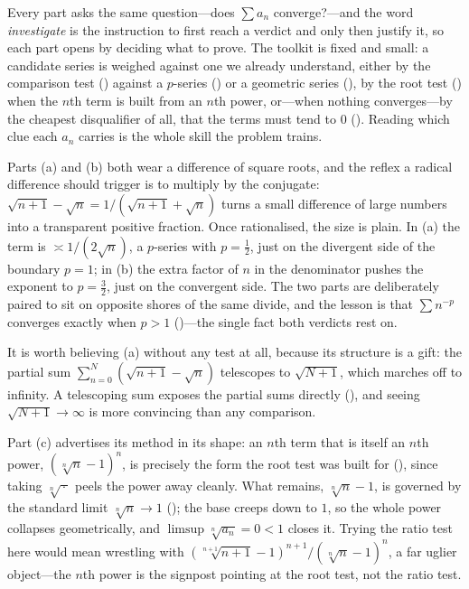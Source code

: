 \documentclass[main.tex]{subfiles}
\begin{document}
\begin{Reflection}
Every part asks the same question---does $\sum a_n$ converge?---and the word \emph{investigate} is the
instruction to first reach a verdict and only then justify it, so each part opens by deciding what to
prove. The toolkit is fixed and small: a candidate series is weighed against one we already understand,
either by the comparison test () against a $p$-series () or a geometric
series (), by the root test () when the $n$th term is built from an $n$th
power, or---when nothing converges---by the cheapest disqualifier of all, that the terms must tend to
$0$ (). Reading which clue each $a_n$ carries is the whole skill the problem trains.

Parts (a) and (b) both wear a difference of square roots, and the reflex a radical difference should
trigger is to multiply by the conjugate: $\sqrt{n+1}-\sqrt n=1/(\sqrt{n+1}+\sqrt n)$ turns a small
difference of large numbers into a transparent positive fraction. Once rationalised, the size is plain.
In (a) the term is $\asymp 1/(2\sqrt n)$, a $p$-series with $p=\tfrac12$, just on the divergent side of
the boundary $p=1$; in (b) the extra factor of $n$ in the denominator pushes the exponent to
$p=\tfrac32$, just on the convergent side. The two parts are deliberately paired to sit on opposite
shores of the same divide, and the lesson is that $\sum n^{-p}$ converges exactly when $p>1$
()---the single fact both verdicts rest on.

It is worth believing (a) without any test at all, because its structure is a gift: the partial sum
$\sum_{n=0}^{N}(\sqrt{n+1}-\sqrt n)$ telescopes to $\sqrt{N+1}$, which marches off to infinity. A
telescoping sum exposes the partial sums directly (), and seeing $\sqrt{N+1}\to\infty$ is
more convincing than any comparison.

Part (c) advertises its method in its shape: an $n$th term that is itself an $n$th power,
$(\sqrt[n]{n}-1)^n$, is precisely the form the root test was built for (), since taking
$\sqrt[n]{\,\cdot\,}$ peels the power away cleanly. What remains, $\sqrt[n]{n}-1$, is governed by the
standard limit $\sqrt[n]{n}\to 1$ (); the base creeps down to $1$, so the whole power
collapses geometrically, and $\limsup\sqrt[n]{a_n}=0<1$ closes it. Trying the ratio test here would
mean wrestling with $(\sqrt[n+1]{n+1}-1)^{n+1}/(\sqrt[n]{n}-1)^n$, a far uglier object---the $n$th
power is the signpost pointing at the root test, not the ratio test.


\end{Reflection}
\end{document}

